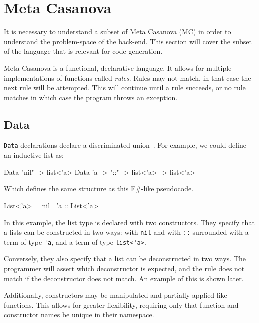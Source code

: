 \section{Meta Casanova}
It is necessary to understand a subset of Meta Casanova (MC) in order to understand the problem-space of the back-end.
This section will cover the subset of the language that is relevant for code generation.

Meta Casanova is a functional, declarative language.
It allows for multiple implementations of functions called \textit{rules}.
Rules may not match, in that case the next rule will be attempted.
This will continue until a rule succeeds, or no rule matches in which case the program throws an exception.

\subsection{Data}\label{mcdata}
\texttt{Data} declarations declare a discriminated union~\cite{algebraic_datastructures}.
For example, we could define an inductive list as:

\begin{MC}
Data "nil" -> list<'a>
Data 'a -> "::" -> list<'a> -> list<'a>
\end{MC}

Which defines the same structure as this F\#-like pseudocode.

\begin{FS}
List<'a> = nil 
         | 'a :: List<'a>
\end{FS}

In this example, the list type is declared with two constructors.
They specify that a lists can be constructed in two ways: with \verb|nil| and with \verb|::| surrounded with a term of type \verb|'a|, and a term of type \verb|list<'a>|.

Conversely, they also specify that a list can be deconstructed in two ways.
The programmer will assert which deconstructor is expected, and the rule does not match if the deconstructor does not match.
An example of this is shown later.

Additionally, constructors may be manipulated and partially applied like functions.
This allows for greater flexibility, requiring only that function and constructor names be unique in their namespace.

%
%

